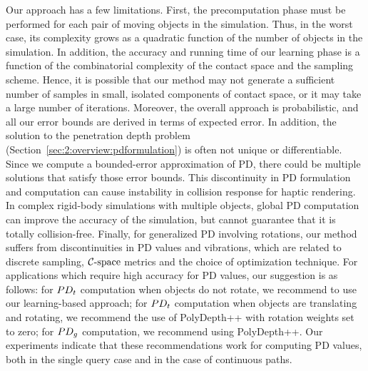 Our approach has a few limitations. First, the precomputation phase must be performed for each pair of moving objects in the simulation. 
Thus, in the worst case, its complexity grows as a quadratic function of the number of objects in the simulation.
In addition, the accuracy and running time of our learning phase is a function of the combinatorial complexity of the contact
space and the sampling scheme. Hence, it is possible that our method may not generate a sufficient number of samples in small,
isolated components of contact space, or it may take a large number of iterations.
Moreover, the overall approach is probabilistic, and all our error bounds are derived in terms of expected error.
In addition, the solution to the penetration depth problem (Section~\ref{sec:2:overview:pdformulation}) is often not unique or differentiable. Since we compute a bounded-error approximation of PD, there could be multiple solutions that satisfy those error bounds. This discontinuity in PD formulation and computation can cause instability in collision response for haptic rendering. In complex rigid-body simulations with multiple objects, global PD computation can improve the accuracy of the simulation, but cannot guarantee that it is totally collision-free. Finally, for generalized PD involving rotations, our method suffers from discontinuities in PD values and vibrations, which are related to discrete sampling, $\mathcal C\text{-space}$ metrics and the choice of optimization technique. For applications which require high accuracy for PD values, our suggestion is as follows:
for $PD_t$ computation when objects do not rotate, we recommend to use our learning-based approach; for $PD_t$ computation when objects are translating and rotating, we recommend the use of PolyDepth++ with rotation weights set to zero; for $PD_g$ computation, we recommend using PolyDepth++. Our experiments indicate that these recommendations work for computing PD values, both in the single query case and in the case of continuous paths.



